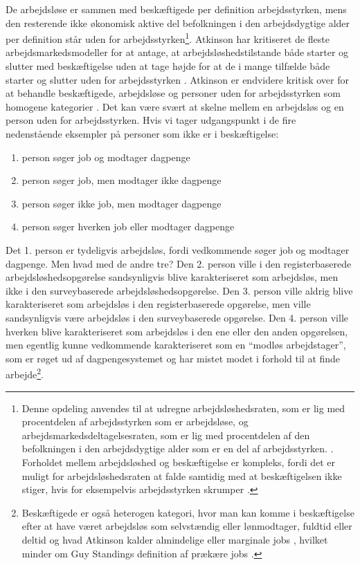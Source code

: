 De arbejdsløse er sammen med beskæftigede per definition arbejdsstyrken, mens den resterende ikke økonomisk aktive del befolkningen i den arbejdsdygtige alder per definition står uden for arbejdsstyrken\footnote{Denne opdeling anvendes til at udregne arbejdsløshedsraten, som er lig med procentdelen af arbejdsstyrken som er arbejdsløse, og arbejdsmarkedsdeltagelsesraten, som er lig med procentdelen af den befolkningen i den arbejdsdygtige alder som er en del af arbejdsstyrken. \parencite[595]{Mankiw2011}. Forholdet mellem arbejdsløshed og beskæftigelse er kompleks, fordi det er muligt for arbejdsløshedsraten at falde samtidig med at beskæftigelsen ikke stiger, hvis for eksempelvis arbejdsstyrken skrumper \parencite[449]{Cahuc2004}.}. Atkinson har kritiseret de fleste arbejdsmarkedsmodeller for at antage, at arbejdsløshedstilstande både starter og slutter med beskæftigelse uden at tage højde for at de i mange tilfælde både starter og slutter uden for arbejdsstyrken \parencite[1683]{Atkinson1991}. Atkinson er endvidere kritisk over for at behandle beskæftigede, arbejdsløse og personer uden for arbejdsstyrken som homogene kategorier \parencite[1683]{Atkinson1991}. Det kan være svært at skelne mellem en arbejdsløs og en person uden for arbejdsstyrken. Hvis vi tager udgangspunkt i de fire nedenstående eksempler på personer som ikke er i beskæftigelse:
%
 \begin{enumerate} [topsep=6pt,itemsep=-1ex]
   \item person søger job og modtager dagpenge
   \item person søger job, men modtager ikke dagpenge
   \item person søger ikke job, men modtager dagpenge
   \item person søger hverken job eller modtager dagpenge
 \end{enumerate}
% 
Det 1. person er tydeligvis arbejdsløs, fordi vedkommende søger job og modtager dagpenge. Men hvad med de andre tre? Den 2. person ville i den registerbaserede arbejdsløshedsopgørelse sandsynligvis blive karakteriseret som arbejdsløs, men ikke i den surveybaserede arbejdsløshedsopgørelse. Den 3. person ville aldrig blive karakteriseret som arbejdsløs i den registerbaserede opgørelse, men ville sandsynligvis være arbejdsløs i den surveybaserede opgørelse. %
Den 4. person ville hverken blive karakteriseret som arbejdsløs i den ene eller den anden opgørelsen, men egentlig kunne vedkommende karakteriseret som en “modløs arbejdstager”, som er røget ud af dagpengesystemet og har mistet modet i forhold til at finde arbejde\footnote{Beskæftigede er også heterogen kategori, hvor man kan komme i beskæftigelse efter at have været arbejdsløs som selvstændig eller lønmodtager, fuldtid eller deltid og hvad Atkinson kalder almindelige eller marginale jobs \parencite[1685]{Atkinson1991}, hvilket minder om Guy Standings definition af prækære jobs \parencite[168]{Standing2011}.}.

